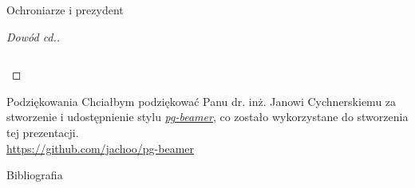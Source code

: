 \documentclass[polish]{beamer}
\begin{document}
\begin{frame}{Ochroniarze i prezydent}
\begin{proof}[Dowód cd.]
\begin{example}
\begin{columns}
{
                    }
            \end{columns}
        \end{example}  
    \end{proof}
\end{frame}

\begin{frame}{Podziękowania}
    Chciałbym podziękować Panu dr. inż. Janowi Cychnerskiemu za stworzenie 
    i udostępnienie stylu \href{https://github.com/jachoo/pg-beamer}{\emph{pg-beamer}}, 
    co zostało wykorzystane do stworzenia tej prezentacji.\\
    \url{https://github.com/jachoo/pg-beamer}
     
\end{frame}

\begin{frame}[allowframebreaks]{Bibliografia}
    
    
\end{frame}

\pglastframe


\end{document}
